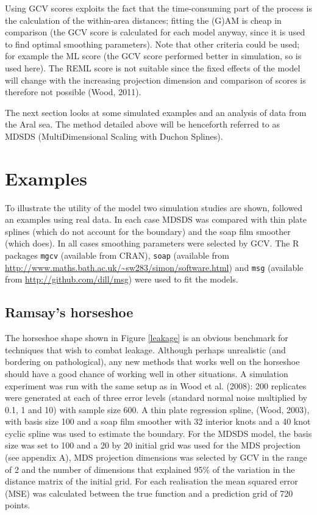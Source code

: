 \documentclass[useAMS, referee]{biom}
\begin{document}
Using GCV scores exploits the fact that the time-consuming part of the process is the calculation of the within-area distances; fitting the (G)AM is cheap in comparison (the GCV score is calculated for each model anyway, since it is used to find optimal smoothing parameters). Note that other criteria could be used; for example the ML score (the GCV score performed better in simulation, so is used here). The REML score is not suitable since the fixed effects of the model will change with the increasing projection dimension and comparison of scores is therefore not possible (Wood, 2011). 

The next section looks at some simulated examples and an analysis of data from the Aral sea. The method detailed above will be henceforth referred to as MDSDS (MultiDimensional Scaling with Duchon Splines).

\section{Examples}
\label{examples}

To illustrate the utility of the model two simulation studies are shown, followed an examples using real data. In each case MDSDS was compared with thin plate splines (which do not account for the boundary) and the soap film smoother (which does). In all cases smoothing parameters were selected by GCV. The \textsf{R} packages \texttt{mgcv} (available from CRAN), \texttt{soap} (available from \url{http://www.maths.bath.ac.uk/~sw283/simon/software.html}) and \texttt{msg} (available from \url{http://github.com/dill/msg}) were used to fit the models.

\subsection{Ramsay's horseshoe}

The horseshoe shape shown in Figure \ref{leakage} is an obvious benchmark for techniques that wish to combat leakage. Although perhaps unrealistic (and bordering on pathological), any new methods that works well on the horseshoe should have a good chance of working well in other situations. A simulation experiment was run with the same setup as in Wood et al. (2008): 200 replicates were generated at each of three error levels (standard normal noise multiplied by 0.1, 1 and 10) with sample size 600. A thin plate regression spline, (Wood, 2003), with basis size 100 and a soap film smoother with 32 interior knots  and a 40 knot cyclic  spline was used to estimate the boundary. For the MDSDS model, the basis size was set to 100 and a 20 by 20 initial grid was used for the MDS projection (see appendix A), MDS projection dimensions was selected by GCV in the range of 2 and the number of dimensions that explained 95\% of the variation in the distance matrix of the initial grid. For each realisation the mean squared error (MSE) was calculated between the true function and a prediction grid of 720 points.
\end{document}

